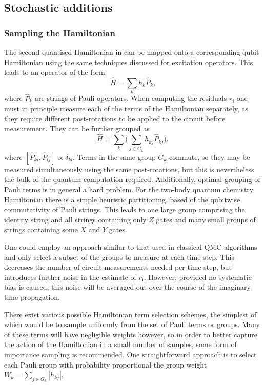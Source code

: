 \documentclass[%
 reprint,
 amsmath,amssymb,
 aps,
]{revtex4-2}
\begin{document}
\subsection{Stochastic additions}

\subsubsection{Sampling the Hamiltonian}

The second-quantised Hamiltonian in  can be mapped onto a corresponding qubit Hamiltonian using the same techniques discussed for excitation operators. This leads to an operator of the form
\begin{equation}
    \hat H = \sum_k h_k \hat P_k,
\end{equation}
where $\hat P_k$ are strings of Pauli operators. When computing the residuals $r_\mathbf{i}$ one must in principle measure each of the terms of the Hamiltonian separately, as they require different post-rotations to be applied to the circuit before measurement. They can be further grouped\cite{McClean2016, Kandala2017} as 
\begin{equation}
    \hat H = \sum_k \big( \sum_{j \in G_k}  h_{kj} \hat P_{kj}\big), 
\end{equation}
where $[\hat P_{ki}, \hat P_{lj}] \propto \delta_{kl}$. Terms in the same group $G_k$ commute, so they may be measured simultaneously using the same post-rotations, but this is nevertheless the bulk of the quantum computation required. Additionally, optimal grouping of Pauli terms is in general a hard problem.\cite{Gokhale2020} For the two-body quantum chemistry Hamiltonian there is a simple heuristic partitioning, based of the qubitwise commutativity of Pauli strings. This leads to one large group comprising the identity string and all strings containing only $Z$ gates and many small groups of strings containing some $X$ and $Y$ gates.

One could employ an approach similar to that used in classical QMC algorithms and only select a subset of the groups to measure at each time-step. This decreases the number of circuit measurements needed per time-step, but introduces further noise in the estimate of $r_\mathbf{i}$. However, provided no systematic bias is caused, this noise will be averaged out over the course of the imaginary-time propagation.

There exist various possible Hamiltonian term selection schemes, the simplest of which would be to sample uniformly from the set of Pauli terms or groups. Many of these terms will have negligible weights however, so in order to better capture the action of the Hamiltonian in a small number of samples, some form of importance sampling is recommended. One straightforward approach is to select each Pauli group with probability proportional the group weight $W_k = \sum_{j \in G_k} |h_{kj}|$,
\end{document}
